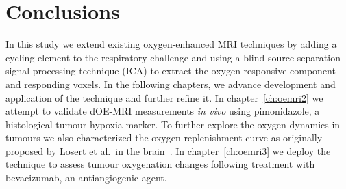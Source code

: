 \section{Conclusions}
In this study we extend existing oxygen-enhanced MRI techniques by adding a cycling element to the respiratory challenge and using a blind-source separation signal processing technique (\acs{ICA}) to extract the oxygen responsive component and responding voxels.
In the following chapters, we advance development and application of the technique and further refine it. 
In chapter~\ref{ch:oemri2} we attempt to validate \acs{dOE-MRI} measurements \emph{in vivo} using pimonidazole, a histological tumour hypoxia marker.
To further explore the oxygen dynamics in tumours we also characterized the oxygen replenishment curve as originally proposed by Losert et al.\ in the brain~\cite{Losert:2002gt}.
In chapter~\ref{ch:oemri3} we deploy the technique to assess tumour oxygenation changes following treatment with bevacizumab, an antiangiogenic agent.

\endinput
